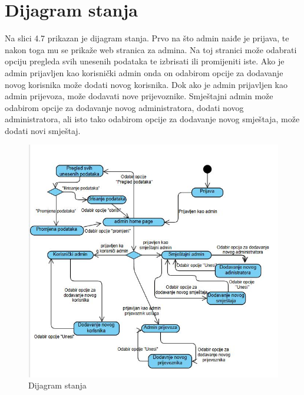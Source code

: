 			
			
			
			
			
			
			\eject
		
		\section{Dijagram stanja}
			
			{Na slici 4.7 prikazan je dijagram stanja. Prvo na što admin naiđe je prijava, te nakon toga mu se prikaže web stranica za admina. Na toj stranici može odabrati opciju pregleda svih unesenih podataka te izbrisati ili promijeniti iste. Ako je admin prijavljen kao korisnički admin onda on odabirom opcije za 
			dodavanje novog korisnika može dodati novog korisnika. Dok ako je admin prijavljen kao admin prijevoza, može dodavati nove prijevoznike. Smještajni admin može odabirom opcije za dodavanje novog administratora, dodati novog administratora, ali isto tako odabirom opcije za dodavanje novog smještaja, može dodati novi smještaj.  }
			
			\begin{figure}[H]
				\includegraphics[width=\linewidth]{slike/Dijagram stanja.JPG}
				\centering
				\caption{Dijagram stanja}
				\label{fig:Dijagram stanja}
			\end{figure}

